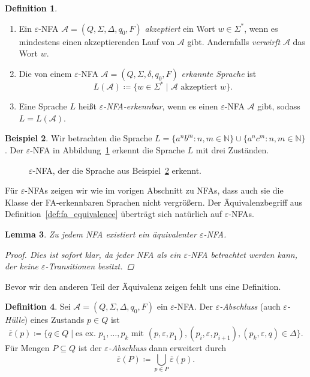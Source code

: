 \documentclass[11pt, a4paper]{article}
\theoremstyle{definition}
\newtheorem{definition}{Definition}[section]
\newtheorem{example}[definition]{Beispiel}
\theoremstyle{plain}
\newtheorem{lemma}[definition]{Lemma}
\numberwithin{equation}{section}
\newcommand{\comp}[1]{\overline{#1}}
\begin{document}
\begin{definition}
\
	\begin{enumerate}
		\item Ein $\varepsilon$-NFA $\mathcal{A} = (Q, \Sigma, \Delta, q_0, F)$ \textit{akzeptiert} ein Wort $w \in \Sigma^\ast$, wenn es mindestens einen akzeptierenden Lauf von $\mathcal{A}$ gibt. Andernfalls \textit{verwirft} $\mathcal{A}$ das Wort $w$.
		\item Die von einem $\varepsilon$-NFA $\mathcal{A} = (Q, \Sigma, \delta, q_0, F)$ \textit{erkannte Sprache} ist
			$$
				L(\mathcal{A}) \coloneqq \{ w \in \Sigma^\ast \mid \mathcal{A} \text{ akzeptiert } w \}.
			$$
		\item Eine Sprache $L$ heißt \textit{$\varepsilon$-NFA-erkennbar}, wenn es einen $\varepsilon$-NFA $\mathcal{A}$ gibt, sodass $L = L(\mathcal{A})$.
	\end{enumerate}
\end{definition}
\begin{example}\label{exp:epsnfa}
	Wir betrachten die Sprache $L = \{ a^n b^m : n, m \in \mathbb{N} \} \cup \{ a^n c^m : n, m \in \mathbb{N} \}$. Der $\varepsilon$-NFA in Abbildung~\ref{fig:epsnfa_ex1} erkennt die Sprache $L$ mit drei Zuständen.
\end{example}
\begin{figure}
	\centering
	
	\caption{$\varepsilon$-NFA, der die Sprache aus Beispiel~\ref{exp:epsnfa} erkennt.}
	\label{fig:epsnfa_ex1}
\end{figure}
Für $\varepsilon$-NFAs zeigen wir wie im vorigen Abschnitt zu NFAs, dass auch sie die Klasse der FA-erkennbaren Sprachen nicht vergrößern. Der Äquivalenzbegriff aus Definition~\ref{def:fa_equivalence} überträgt sich natürlich auf $\varepsilon$-NFAs.
\begin{lemma}
	Zu jedem NFA existiert ein äquivalenter $\varepsilon$-NFA.
	\begin{proof}
		Dies ist sofort klar, da jeder NFA als ein $\varepsilon$-NFA betrachtet werden kann, der keine $\varepsilon$-Transitionen besitzt.
	\end{proof}
\end{lemma}
Bevor wir den anderen Teil der Äquivalenz zeigen fehlt uns eine Definition.
\begin{definition}\label{def:eps_closure}
	Sei $\mathcal{A} = (Q, \Sigma, \Delta, q_0, F)$ ein $\varepsilon$-NFA. Der \textit{$\varepsilon$-Abschluss} (auch \textit{$\varepsilon$-Hülle}) eines Zustands $p \in Q$ ist
	$$
		\comp{\varepsilon}(p) \coloneqq \{ q \in Q \mid \text{es ex. } p_1, \ldots, p_k \text{ mit } (p, \varepsilon, p_1), (p_i, \varepsilon, p_{i+1}), (p_k, \varepsilon, q) \in \Delta \}.
	$$
	Für Mengen $P \subseteq Q$ ist der \textit{$\varepsilon$-Abschluss} dann erweitert durch
	$$
		\comp{\varepsilon}(P) \coloneqq \bigcup_{p \in P} \comp{\varepsilon}(p).
	$$
\end{definition}
\end{document}

